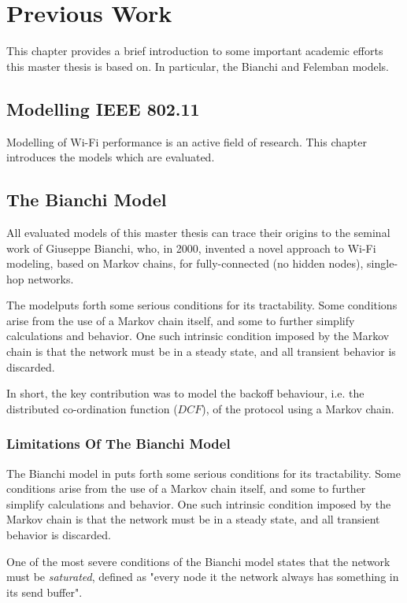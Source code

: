 \chapter{Previous Work}

This chapter provides a brief introduction to some important academic efforts this master thesis is based on. In particular, the Bianchi and Felemban models.

\section{Modelling IEEE 802.11}
Modelling of Wi-Fi performance is an active field of research. This chapter introduces the models which are evaluated.

\section{The Bianchi Model}

All evaluated models of this master thesis can trace their origins to the seminal work of Giuseppe Bianchi, who, in 2000, invented a novel approach to Wi-Fi modeling, based on Markov chains\cite{bianchi}, for fully-connected (no hidden nodes), single-hop networks.

The modelputs forth some serious conditions for its tractability. Some conditions arise from the use of a Markov chain itself, and some to further simplify calculations and behavior. One such intrinsic condition imposed by the Markov chain is that the network must be in a steady state, and all transient behavior is discarded.

In short, the key contribution was to model the backoff behaviour, i.e. the distributed co-ordination function ($DCF$), of the protocol using a Markov chain.

\subsection{Limitations Of The Bianchi Model}
The Bianchi model in \cite{bianchi} puts forth some serious conditions for its tractability. Some conditions arise from the use of a Markov chain itself, and some to further simplify calculations and behavior. One such intrinsic condition imposed by the Markov chain is that the network must be in a steady state, and all transient behavior is discarded.

One of the most severe conditions of the Bianchi model states that the network must be \emph{saturated}, defined as "every node it the network always has something in its send buffer".

